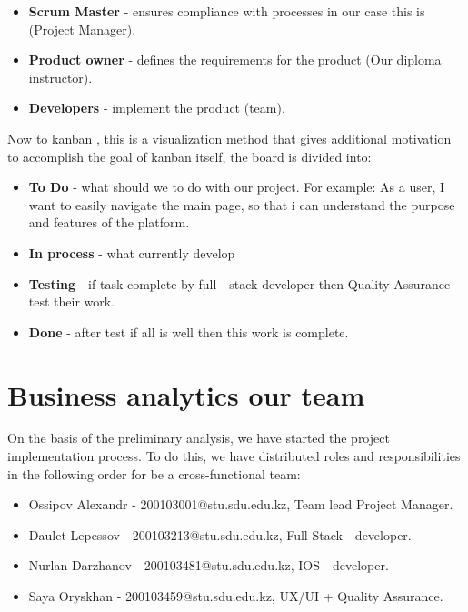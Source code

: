 \begin{itemize}
    \item \textbf{Scrum Master} - ensures compliance with processes in our case this is  (Project Manager).
    \item \textbf{Product owner} - defines the requirements for the product (Our diploma instructor).
    \item \textbf{Developers} - implement the product (team). 
\end{itemize}

Now to kanban \cite{kanban}, this is a visualization method that gives additional motivation to accomplish the goal of kanban itself, the board is divided into: 

\begin{itemize}
    \item \textbf{To Do} - what should we to do with our project. For example: As a user, I want to easily navigate the main page, so that i can understand the purpose and features of the platform.
    \item \textbf{In process} - what currently develop 
    \item \textbf{Testing} - if task complete by full - stack developer then Quality Assurance test their work.
    \item \textbf{Done} - after test if all is well then this work is complete.
    
\end{itemize}

\section{Business analytics our team}\label{bussanl}
On the basis of the preliminary analysis, we have started the project implementation process. To do this, we have distributed roles and responsibilities in the following order for be a cross-functional team:

\begin{itemize}
    \item Ossipov Alexandr - 200103001@stu.sdu.edu.kz, Team lead Project Manager. 
    \item Daulet Lepessov  - 200103213@stu.sdu.edu.kz, Full-Stack - developer. 
    \item Nurlan Darzhanov - 200103481@stu.sdu.edu.kz, IOS - developer. 
    \item Saya Oryskhan  - 200103459@stu.sdu.edu.kz, UX/UI + Quality Assurance.  
\end{itemize}

